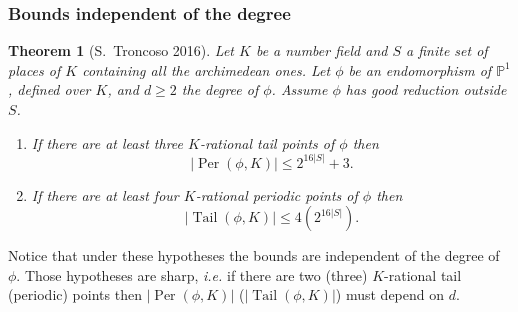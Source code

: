 \documentclass{beamer}
\def\PP{{\mathbb P}}
\def\QQ{{\mathbb Q}}
\DeclareMathOperator{\Tail}{Tail}
\DeclareMathOperator{\Per}{Per}
\theoremstyle{thmstyle}
\theoremstyle{thmstyle}
\newtheorem*{mythm}{Theorem}
\theoremstyle{mystyle}
\theoremstyle{qstnstyle}
\begin{document}
%
% 
%





\begin{frame}
\frametitle{Bounds independent of the degree}
\begin{mythm}[S.\ Troncoso 2016]
Let $K$ be a number field and $S$ a finite set of places of $K$ containing all the archimedean ones. Let $\phi $ be an endomorphism of $\PP^1$, defined over $K$, and $d \geq 2$ the degree of $\phi$. Assume $\phi$ has  good reduction outside $S$.
\begin{enumerate}

\item [(a)] 
If there are at least three $K$-rational tail points of $\phi$ then
$$|\Per(\phi,K)| \leq 2^{16|S|}+3. $$

\item [(b)]
If there are at least four $K$-rational periodic points of $\phi$ then
$$|\Tail(\phi,K)| \leq 4(2^{16|S|}).$$
\end{enumerate}
\end{mythm}
 
Notice that under these hypotheses the bounds are independent of the degree of $\phi$. Those hypotheses are sharp, \emph{i.e.} if there are two (three) $K$-rational tail (periodic) points then $|\Per(\phi,K)|$ ($|\Tail(\phi,K)|$) must depend on $d$. 
\end{frame}
\end{document}

